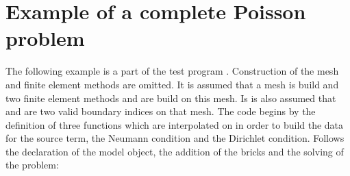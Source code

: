 \documentclass[a4paper,11pt,english]{sphinxmanual}
\begin{document}
\ignorespaces 

\section{Example of a complete Poisson problem}
\label{\detokenize{userdoc/model_poisson:example-of-a-complete-poisson-problem}}\label{\detokenize{userdoc/model_poisson:ud-model-poisson}}\label{\detokenize{userdoc/model_poisson:index-0}}\label{\detokenize{userdoc/model_poisson::doc}}
The following example is a part of the test program
. Construction of the mesh and finite
element methods are omitted. It is assumed that a mesh is build and two finite
element methods  and  are build on this mesh. Is is also
assumed that  and  are two
valid boundary indices on that mesh. The code begins by the definition of three
functions which are interpolated on  in order to build the data for the
source term, the Neumann condition and the Dirichlet condition. Follows the
declaration of the model object, the addition of the bricks and the solving of
the problem:
\end{document}
